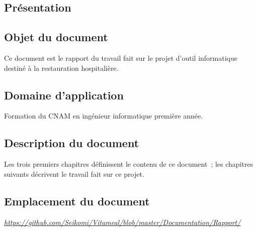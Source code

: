 \textcolor[RGB]{46, 116, 181}{\chapter{Présentation}}
\section{Objet du document}
Ce document est le rapport du travail fait sur le projet d'outil informatique destiné à la restauration hospitalière.

\section{Domaine d'application}
Formation du CNAM en ingénieur informatique première année.

\section{Description du document}
Les trois premiers chapitres définissent le contenu de ce document~; les chapitres suivants décrivent le travail fait sur ce projet.

\section{Emplacement du document}
\href{https://github.com/Seikomi/Vitameal/blob/master/Documentation/Rapport/}{\emph{https://github.com/Seikomi/Vitameal/blob/master/Documentation/Rapport/}}

